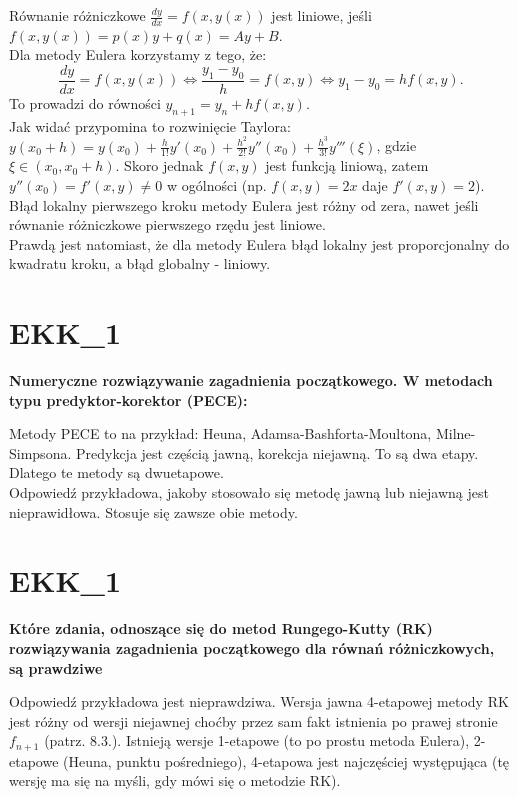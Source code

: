 \vspace{0.4cm}
\noindent Równanie różniczkowe $\frac{dy}{dx}=f(x,y(x))$ jest liniowe, jeśli $f(x,y(x))=p(x)y+q(x)=Ay+B.$\\
Dla metody Eulera korzystamy z tego, że:$$\frac{dy}{dx}=f(x,y(x)) \Leftrightarrow \frac{y_1-y_0}{h}=f(x,y) \Leftrightarrow y_1-y_0=hf(x,y).$$ To prowadzi do równości $y_{n+1}=y_n+hf(x,y)$.\\
Jak widać przypomina to rozwinięcie Taylora: $y(x_0+h)=y(x_0)+\frac{h}{1!}y'(x_0)+\frac{h^2}{2!}y''(x_0)+\frac{h^3}{3!}y'''(\xi)$, gdzie $\xi \in (x_0, x_0+h)$. Skoro jednak $f(x,y)$ jest funkcją liniową, zatem $y''(x_0)=f'(x,y)\neq0$ w ogólności (np. $f(x,y)=2x$ daje $f'(x,y)=2$). Błąd lokalny pierwszego kroku metody Eulera jest różny od zera, nawet jeśli równanie różniczkowe pierwszego rzędu jest liniowe.\\
Prawdą jest natomiast, że dla metody Eulera błąd lokalny jest proporcjonalny do kwadratu kroku, a błąd globalny - liniowy.

\newpage
\section{EKK\_1}
\textbf{Numeryczne rozwiązywanie zagadnienia początkowego. W metodach typu predyktor-korektor (PECE):}

\vspace{0.4cm}
\noindent Metody PECE to na przykład: Heuna, Adamsa-Bashforta-Moultona, Milne-Simpsona. Predykcja jest częścią jawną, korekcja niejawną. To są dwa etapy. Dlatego te metody są dwuetapowe.\\
Odpowiedź przykładowa, jakoby stosowało się metodę jawną lub niejawną jest nieprawidłowa. Stosuje się zawsze obie metody.

\section{EKK\_1}
\textbf{Które zdania, odnoszące się do metod Rungego-Kutty (RK) rozwiązywania zagadnienia początkowego dla równań różniczkowych, są prawdziwe}

\vspace{0.4cm}
\noindent Odpowiedź przykładowa jest nieprawdziwa. Wersja jawna 4-etapowej metody RK jest różny od wersji niejawnej choćby przez sam fakt istnienia po prawej stronie $f_{n+1}$ (patrz. 8.3.). Istnieją wersje 1-etapowe (to po prostu metoda Eulera), 2-etapowe (Heuna, punktu pośredniego), 4-etapowa jest najczęściej występująca (tę wersję ma się na myśli, gdy mówi się o metodzie RK). 

